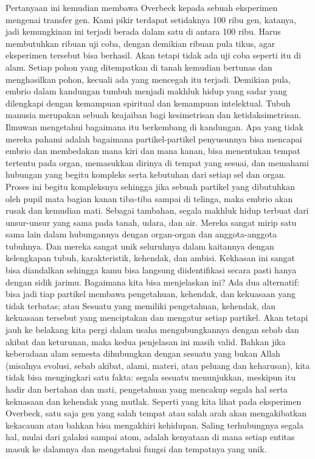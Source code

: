 \documentclass[]{article}
\begin{document}
Pertanyaan ini kemudian membawa Overbeck kepada sebuah eksperimen mengenai transfer gen. Kami pikir terdapat setidaknya 100 ribu gen, katanya, jadi kemungkinan ini terjadi berada dalam satu di antara 100 ribu. 
Harus membutuhkan ribuan uji coba, dengan demikian ribuan pula tikus, agar eksperimen tersebut bisa berhasil. Akan tetapi tidak ada uji coba seperti itu di alam. Setiap pohon yang ditempatkan di tanah kemudian bertunas dan menghasilkan pohon, kecuali ada yang mencegah itu terjadi. Demikian pula, embrio dalam kandungan tumbuh menjadi makhluk hidup yang sadar yang dilengkapi dengan kemampuan spiritual dan kemampuan intelektual. 
Tubuh manusia merupakan sebuah keajaiban bagi kesimetrisan dan ketidaksimetrisan. Ilmuwan mengetahui bagaimana itu berkembang di kandungan. Apa yang tidak mereka pahami adalah bagaimana partikel-partikel penyusunnya bisa mencapai embrio dan membedakan mana kiri dan mana kanan, bisa menentukan tempat tertentu pada organ, memasukkan dirinya di tempat yang sesuai, dan memahami hubungan yang begitu kompleks serta kebutuhan dari setiap sel dan organ. Proses ini begitu kompleksnya sehingga jika sebuah partikel yang dibutuhkan oleh pupil mata bagian kanan tiba-tiba sampai di telinga, maka embrio akan rusak dan kemudian mati. 
Sebagai tambahan, segala makhluk hidup terbuat dari unsur-unsur yang sama pada tanah, udara, dan air. Mereka sangat mirip satu sama lain dalam hubungannya dengan organ-organ dan anggota-anggota tubuhnya. Dan mereka sangat unik seluruhnya dalam kaitannya dengan kelengkapan tubuh, karakteristik, kehendak, dan ambisi. Kekhasan ini sangat bisa diandalkan sehingga kamu bisa langsung diidentifikasi secara pasti hanya dengan sidik jarimu. 
Bagaimana kita bisa menjelaskan ini? Ada dua alternatif: bisa jadi tiap partikel membawa pengetahuan, kehendak, dan kekuasaan yang tidak terbatas; atau Sesuatu yang memiliki pengetahuan, kehendak, dan kekuasaan tersebut yang menciptakan dan mengatur setiap partikel.  Akan tetapi jauh ke belakang kita pergi dalam usaha  mengubungkannya dengan sebab dan akibat dan keturunan, maka kedua penjelasan ini masih valid. 
Bahkan jika keberadaan alam semesta dihubungkan dengan sesuatu yang bukan Allah (misalnya evolusi, sebab akibat, alami, materi, atau peluang dan keharusan), kita tidak bisa mengingkari satu fakta: segala sesuatu menunjukkan, meskipun itu hadir dan bertahan dan mati, pengetahuan yang mencakup segala hal serta kekuasaan dan kehendak yang mutlak. Seperti yang kita lihat pada eksperimen Overbeck, satu saja gen yang salah tempat atau salah arah akan mengakibatkan kekacauan atau bahkan bisa mengakhiri kehidupan. Saling terhubungnya segala hal, mulai dari galaksi sampai atom, adalah kenyataan di mana setiap entitas masuk ke dalamnya dan mengetahui fungsi dan tempatnya yang unik. 
\end{document}
